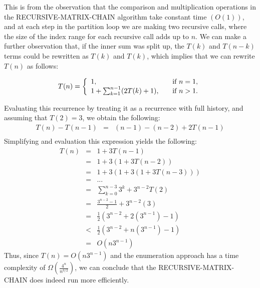 \documentclass[11pt]{article}
\begin{document}
\begin{sol}
This is from the observation that the comparison and multiplication operations in the RECURSIVE-MATRIX-CHAIN algorithm take constant time $(O(1))$, and at each step in the partition loop we are making two recursive calls, where the size of the index range for each recursive call adds up to $n$. We can make a further observation that, if the inner sum was split up, the $T(k)$ and $T(n-k)$ terms could be rewritten as $T(k)$ and $T(k)$, which implies that we can rewrite $T(n)$ as follows:

\[
T(n) = \left\{ 
  \begin{array}{l l}
    1, & \quad \text{if $n = 1$}, \\
    1 + \sum_{k=1}^{n-1}(2T(k) + 1), & \quad \text{if $n > 1$}. \\
  \end{array} \right.
\]

Evaluating this recurrence by treating it as a recurrence with full history, and assuming that $T(2) = 3$, we obtain the following:
\begin{eqnarray*}
T(n) - T(n - 1) & = & (n - 1) - (n - 2) + 2T(n-1) \\
\end{eqnarray*}
Simplifying and evaluation this expression yields the following:
\begin{eqnarray*}
T(n) & = & 1 + 3T(n-1) \\
& = & 1 + 3(1 + 3T(n-2)) \\
& = & 1 + 3(1 + 3(1 + 3T(n-3))) \\
& = & ... \\
& = & \sum_{k=0}^{n-3}3^k + 3^{n-2}T(2) \\
& = & \frac{3^{n-2} - 1}{2} + 3^{n-2}(3) \\
& = & \frac{1}{2}(3^{n-2} + 2(3^{n-1}) - 1) \\
& < & \frac{1}{2}(3^{n-2} + n(3^{n-1}) - 1) \\
& = & O(n3^{n-1})
\end{eqnarray*}
Thus, since $T(n) = O(n3^{n-1})$ and the enumeration approach has a time complexity of $\Omega(\frac{4^n}{n^{3/2}})$, we can conclude that the RECURSIVE-MATRIX-CHAIN does indeed run more efficiently. 
\end{sol}
\end{document}
